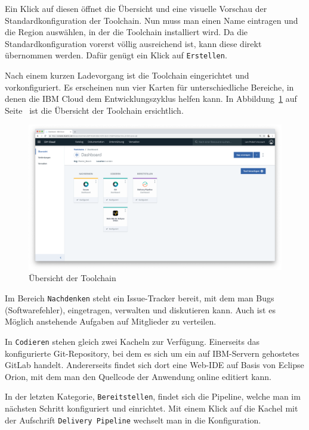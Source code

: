 Ein Klick auf diesen öffnet die Übersicht und eine visuelle Vorschau der Standardkonfiguration der Toolchain. Nun muss
man einen Name eintragen und die Region auswählen, in der die Toolchain installiert wird. Da die Standardkonfiguration
vorerst völlig ausreichend ist, kann diese direkt übernommen werden. Dafür genügt ein Klick auf \texttt{Erstellen}.

Nach einem kurzen Ladevorgang ist die Toolchain eingerichtet und vorkonfiguriert. Es erscheinen nun vier Karten für
unterschiedliche Bereiche, in denen die IBM Cloud dem Entwicklungszyklus helfen kann. In
Abbildung~\ref{fig:umsetzung_toolchain} auf Seite~\pageref{fig:umsetzung_toolchain} ist die Übersicht der Toolchain
ersichtlich.

\begin{figure}[h]
    \centering
    \includegraphics[width=\textwidth]{images/kapitel_3/toolchain_overview.png}
    \caption{Übersicht der Toolchain}
    \label{fig:umsetzung_toolchain}
\end{figure}

Im Bereich \texttt{Nachdenken} steht ein Issue-Tracker bereit, mit dem man Bugs (Softwarefehler), eingetragen,
verwalten und diskutieren kann. Auch ist es Möglich anstehende Aufgaben auf Mitglieder zu verteilen.

In \texttt{Codieren} stehen gleich zwei Kacheln zur Verfügung. Einerseits das konfigurierte Git-Repository, bei dem es
sich um ein auf IBM-Servern gehostetes GitLab handelt. Andererseits findet sich dort eine Web-IDE auf Basis von Eclipse
Orion, mit dem man den Quellcode der Anwendung online editiert kann.

In der letzten Kategorie, \texttt{Bereitstellen}, findet sich die Pipeline, welche man im nächsten Schritt konfiguriert
und einrichtet. Mit einem Klick auf die Kachel mit der Aufschrift \texttt{Delivery Pipeline} wechselt man in die
Konfiguration.

